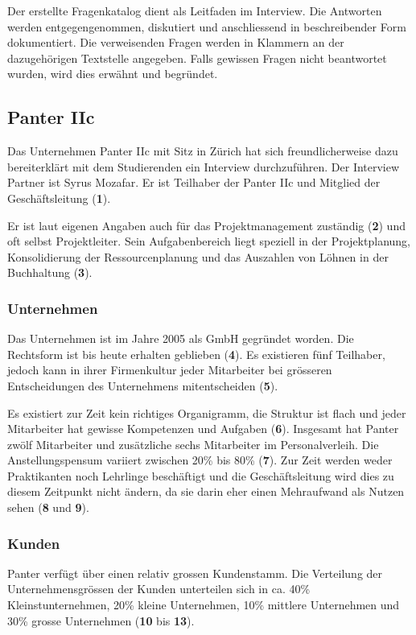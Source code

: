 Der erstellte Fragenkatalog dient als Leitfaden im Interview. Die Antworten
werden entgegengenommen, diskutiert und anschliessend in beschreibender Form
dokumentiert. Die verweisenden Fragen werden in Klammern an der dazugehörigen
Textstelle angegeben. Falls gewissen Fragen nicht beantwortet wurden, wird dies 
erwähnt und begründet.

\subsection{Panter IIc}
Das Unternehmen Panter IIc mit Sitz in Zürich hat sich freundlicherweise dazu
bereiterklärt mit dem Studierenden ein Interview durchzuführen. Der Interview
Partner ist Syrus Mozafar. Er ist Teilhaber der Panter IIc und Mitglied der
Geschäftsleitung (\textbf{1}).

Er ist laut eigenen Angaben auch für das Projektmanagement zuständig (\textbf{2})
und oft selbst Projektleiter. Sein Aufgabenbereich liegt speziell in der 
Projektplanung, Konsolidierung der Ressourcenplanung und das Auszahlen von
Löhnen in der Buchhaltung (\textbf{3}).

\subsubsection{Unternehmen}
Das Unternehmen ist im Jahre 2005 als GmbH gegründet worden. Die Rechtsform
ist bis heute erhalten geblieben (\textbf{4}). Es existieren fünf Teilhaber,
jedoch kann in ihrer Firmenkultur jeder Mitarbeiter bei grösseren Entscheidungen
des Unternehmens mitentscheiden (\textbf{5}).

Es existiert zur Zeit kein richtiges Organigramm, die Struktur ist flach
und jeder Mitarbeiter hat gewisse Kompetenzen und Aufgaben (\textbf{6}). 
Insgesamt hat Panter zwölf Mitarbeiter und zusätzliche sechs Mitarbeiter im
Personalverleih. Die Anstellungspensum variiert zwischen 20\% bis 80\% (\textbf{7}).
Zur Zeit werden weder Praktikanten noch Lehrlinge beschäftigt und die Geschäftsleitung
wird dies zu diesem Zeitpunkt nicht ändern, da sie darin eher einen Mehraufwand
als Nutzen sehen (\textbf{8} und \textbf{9}).

\subsubsection{Kunden}
Panter verfügt über einen relativ grossen Kundenstamm. Die Verteilung
der Unternehmensgrössen der Kunden unterteilen sich in ca. 40\% Kleinstunternehmen,
20\% kleine Unternehmen, 10\% mittlere Unternehmen und 30\% grosse
Unternehmen (\textbf{10} bis \textbf{13}).

